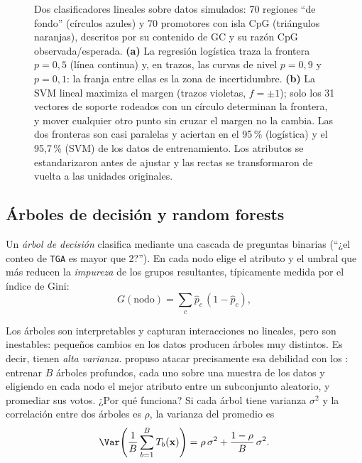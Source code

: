 \begin{figure}[!tbp]
\caption[Fronteras de decisión de regresión logística y SVM]{Dos clasificadores lineales sobre datos simulados: 70 regiones ``de fondo'' (círculos azules) y 70 promotores con isla CpG (triángulos naranjas), descritos por su contenido de GC y su razón CpG observada/esperada. \textbf{(a)} La regresión logística traza la frontera $p=0{,}5$ (línea continua) y, en trazos, las curvas de nivel $p=0{,}9$ y $p=0{,}1$: la franja entre ellas es la zona de incertidumbre. \textbf{(b)} La SVM lineal maximiza el margen (trazos violetas, $f=\pm1$); solo los 31 vectores de soporte rodeados con un círculo determinan la frontera, y mover cualquier otro punto sin cruzar el margen no la cambia. Las dos fronteras son casi paralelas y aciertan en el 95\,\% (logística) y el 95,7\,\% (SVM) de los datos de entrenamiento. Los atributos se estandarizaron antes de ajustar y las rectas se transformaron de vuelta a las unidades originales.}
\label{fig:17-frontera}
\end{figure}

\subsection{Árboles de decisión y random forests}

Un \emph{árbol de decisión} clasifica mediante una cascada de preguntas binarias (``¿el conteo de \texttt{TGA} es mayor que 2?''). En cada nodo elige el atributo y el umbral que más reducen la \emph{impureza} de los grupos resultantes, típicamente medida por el índice de Gini:
\begin{equation}\label{eq:17-gini}
G(\text{nodo}) = \sum_{c} \hat p_c\,(1-\hat p_c),
\end{equation}

\begin{simbolos}
\end{simbolos}

Los árboles son interpretables y capturan interacciones no lineales, pero son inestables: pequeños cambios en los datos producen árboles muy distintos. Es decir, tienen \emph{alta varianza}. \textcite{c17-breiman2001} propuso atacar precisamente esa debilidad con los : entrenar $B$ árboles profundos, cada uno sobre una muestra  de los datos y eligiendo en cada nodo el mejor atributo entre un subconjunto aleatorio, y promediar sus votos. ¿Por qué funciona? Si cada árbol tiene varianza $\sigma^2$ y la correlación entre dos árboles es $\rho$, la varianza del promedio es \parencite{c17-hastie2009}
\begin{equation}\label{eq:17-varbosque}
\Var\!\left(\frac1B\sum_{b=1}^{B}T_b(\mathbf{x})\right) = \rho\,\sigma^2 + \frac{1-\rho}{B}\,\sigma^2 .
\end{equation}

